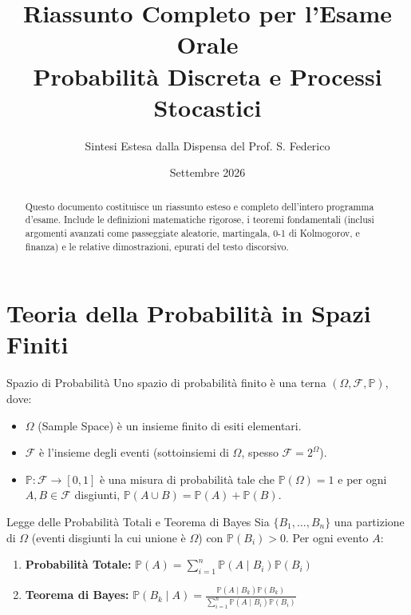 \documentclass[11pt,a4paper]{article}
\title{\textbf{Riassunto Completo per l'Esame Orale}\\
\Large Probabilità Discreta e Processi Stocastici}
\author{Sintesi Estesa dalla Dispensa del Prof. S. Federico}
\date{Settembre 2026}
\begin{document}
\maketitle
\begin{abstract}
Questo documento costituisce un riassunto esteso e completo dell'intero programma d'esame. Include le definizioni matematiche rigorose, i teoremi fondamentali (inclusi argomenti avanzati come passeggiate aleatorie, martingala, 0-1 di Kolmogorov, e finanza) e le relative dimostrazioni, epurati del testo discorsivo.
\end{abstract}
\tableofcontents
\newpage

\section{Teoria della Probabilità in Spazi Finiti}

\begin{definizione}{Spazio di Probabilità}{}
Uno spazio di probabilità finito è una terna $(\Omega, \mathcal{F}, \mathbb{P})$, dove:
\begin{itemize}
    \item $\Omega$ (Sample Space) è un insieme finito di esiti elementari.
    \item $\mathcal{F}$ è l'insieme degli eventi (sottoinsiemi di $\Omega$, spesso $\mathcal{F} = 2^\Omega$).
    \item $\mathbb{P}: \mathcal{F} \to [0,1]$ è una misura di probabilità tale che $\mathbb{P}(\Omega) = 1$ e per ogni $A, B \in \mathcal{F}$ disgiunti, $\mathbb{P}(A \cup B) = \mathbb{P}(A) + \mathbb{P}(B)$.
\end{itemize}
\end{definizione}

\begin{teorema}{Legge delle Probabilità Totali e Teorema di Bayes}{}
Sia $\{B_1, \dots, B_n\}$ una partizione di $\Omega$ (eventi disgiunti la cui unione è $\Omega$) con $\mathbb{P}(B_i) > 0$. Per ogni evento $A$:
\begin{enumerate}
    \item \textbf{Probabilità Totale:} $\mathbb{P}(A) = \sum_{i=1}^n \mathbb{P}(A \mid B_i)\mathbb{P}(B_i)$
    \item \textbf{Teorema di Bayes:} $\mathbb{P}(B_k \mid A) = \frac{\mathbb{P}(A \mid B_k)\mathbb{P}(B_k)}{\sum_{i=1}^n \mathbb{P}(A \mid B_i)\mathbb{P}(B_i)}$
\end{enumerate}
\end{teorema}
\end{document}
